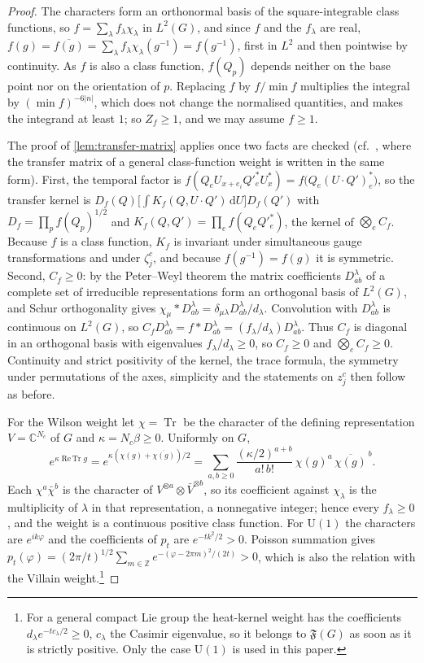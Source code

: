 \documentclass[11pt,a4paper]{amsart}
\theoremstyle{definition}
\theoremstyle{remark}
\numberwithin{equation}{section}
\DeclareMathOperator{\Tr}{Tr}        %
\DeclareMathOperator{\ReTr}{Re\,Tr}  %
\newcommand{\C}{\mathbb{C}}          %
\newcommand{\Z}{\mathbb{Z}}          %
\newcommand{\Fclass}{\mathfrak{F}}   %
\newcommand{\dd}{\,\mathrm{d}}             %
\newcommand{\U}{\mathrm{U}}                %
\begin{document}
\begin{proof}
The characters form an orthonormal basis of the square-integrable class functions, so $f=\sum_\lambda f_\lambda\chi_\lambda$ in $L^2(G)$, and since $f$ and the $f_\lambda$ are real, $f(g)=\overline{f(g)}=\sum_\lambda f_\lambda\chi_\lambda(g^{-1})=f(g^{-1})$, first in $L^2$ and then pointwise by continuity. As $f$ is also a class function, $f(Q_p)$ depends neither on the base point nor on the orientation of $p$. Replacing $f$ by $f/\min f$ multiplies the integral by $(\min f)^{-6|n|}$, which does not change the normalised quantities, and makes the integrand at least $1$; so $Z_f\ge1$, and we may assume $f\ge1$.

The proof of \cref{lem:transfer-matrix} applies once two facts are checked (cf.\ \cite[proof of Proposition~A5]{bhattacharjee2026first}, where the transfer matrix of a general class-function weight is written in the same form). First, the temporal factor is $f(Q_eU_{x+e_i}Q'^*_eU_x^*)=f\bigl(Q_e(U\cdot Q')_e^*\bigr)$, so the transfer kernel is $D_f(Q)\bigl[\int K_f(Q,U\cdot Q')\dd U\bigr]D_f(Q')$ with $D_f=\prod_pf(Q_p)^{1/2}$ and $K_f(Q,Q')=\prod_ef(Q_eQ'^*_e)$, the kernel of $\bigotimes_eC_f$. Because $f$ is a class function, $K_f$ is invariant under simultaneous gauge transformations and under $\zeta_j^c$, and because $f(g^{-1})=f(g)$ it is symmetric. Second, $C_f\ge0$: by the Peter--Weyl theorem the matrix coefficients $D^\lambda_{ab}$ of a complete set of irreducible representations form an orthogonal basis of $L^2(G)$, and Schur orthogonality gives $\chi_\mu*D^\lambda_{ab}=\delta_{\mu\lambda}D^\lambda_{ab}/d_\lambda$. Convolution with $D^\lambda_{ab}$ is continuous on $L^2(G)$, so $C_fD^\lambda_{ab}=f*D^\lambda_{ab}=(f_\lambda/d_\lambda)D^\lambda_{ab}$. Thus $C_f$ is diagonal in an orthogonal basis with eigenvalues $f_\lambda/d_\lambda\ge0$, so $C_f\ge0$ and $\bigotimes_eC_f\ge0$. Continuity and strict positivity of the kernel, the trace formula, the symmetry under permutations of the axes, simplicity and the statements on $z_j^c$ then follow as before.

For the Wilson weight let $\chi=\Tr$ be the character of the defining representation $V=\C^{N_c}$ of $G$ and $\kappa=N_c\beta\ge0$. Uniformly on $G$,
\[
e^{\kappa\ReTr g}=e^{\kappa(\chi(g)+\overline{\chi(g)})/2}=\sum_{a,b\ge0}\frac{(\kappa/2)^{a+b}}{a!\,b!}\,\chi(g)^a\,\overline{\chi(g)}^{\,b}.
\]
Each $\chi^a\bar\chi^b$ is the character of $V^{\otimes a}\otimes\bar V^{\otimes b}$, so its coefficient against $\chi_\lambda$ is the multiplicity of $\lambda$ in that representation, a nonnegative integer; hence every $f_\lambda\ge0$, and the weight is a continuous positive class function. For $\U(1)$ the characters are $e^{ik\varphi}$ and the coefficients of $p_t$ are $e^{-tk^2/2}>0$. Poisson summation gives $p_t(\varphi)=(2\pi/t)^{1/2}\sum_{m\in\Z}e^{-(\varphi-2\pi m)^2/(2t)}>0$, which is also the relation with the Villain weight.\footnote{For a general compact Lie group the heat-kernel weight has the coefficients $d_\lambda e^{-tc_\lambda/2}\ge0$, $c_\lambda$ the Casimir eigenvalue, so it belongs to $\Fclass(G)$ as soon as it is strictly positive. Only the case $\U(1)$ is used in this paper.}
\end{proof}
\end{document}
